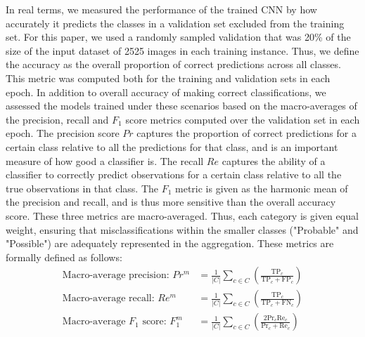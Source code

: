 \documentclass[Journal,letterpaper, SingleSpace, InsideFigs]{ascelike-new}
\begin{document}
In real terms, we measured the performance of the trained CNN by how accurately it predicts the classes in a validation set excluded from the training set. For this paper, we used a randomly sampled validation that was 20\% of the size of the input dataset of 2525 images in each training instance.
Thus, we define the accuracy as the overall proportion of correct predictions across all classes.
This metric was computed both for the training and validation sets in each epoch.
In addition to overall accuracy of making correct classifications, we assessed the models trained under these scenarios based on the macro-averages of the precision, recall and $F_1$ score metrics computed over the validation set in each epoch. The precision score $Pr$ captures the proportion of correct predictions for a certain class relative to all the predictions for that class, and is an important measure of how good a classifier is. The recall $Re$ captures the ability of a classifier to correctly predict observations for a certain class relative to all the true observations in that class. The $F_1$ metric is given as the harmonic mean of the precision and recall, and is thus more sensitive than the overall accuracy score. These three metrics are macro-averaged. Thus, each category is given equal weight, ensuring that misclassifications within the smaller classes ("Probable" and "Possible") are adequately represented in the aggregation. These metrics are formally defined as follows:
\begin{align}
\text{Macro-average precision: }    Pr^m &= \frac{1}{|C|}\sum_{c\in C} \left(  \frac{ \mathrm{TP}_{c} }{\mathrm{TP}_{c} + \mathrm{FP}_c}\right) \\
\text{Macro-average recall: }    Re^m &= \frac{1}{|C|} \sum_{c\in C} \left(  \frac{ \mathrm{TP}_{c} }{\mathrm{TP}_{c} + \mathrm{FN}_c}\right) \\
\text{Macro-average $F_1$ score: }    F_1^m &= \frac{1}{|C|} \sum_{c\in C} \left(  \frac{2  \mathrm{Pr}_{c} \mathrm{Re}_{c}}{\mathrm{Pr}_{c} + \mathrm{Re}_c}\right)
\end{align}
\end{document}

